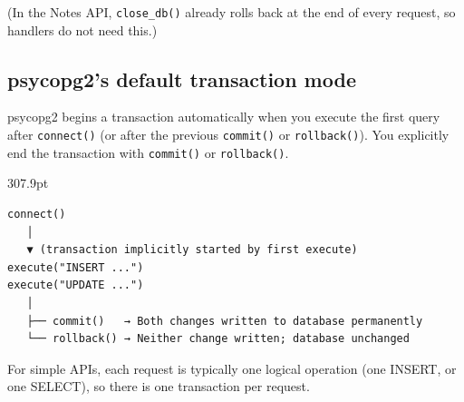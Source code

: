 \begin{codebox}[short]

\begin{Shaded}
\begin{Highlighting}[]
\NormalTok{:}
 \NormalTok{:}
\end{Highlighting}
\end{Shaded}

\end{codebox}

\noindent{}(In the Notes API, \texttt{close\_db()} already rolls back at the end of every request, so handlers do not need this.)

\subsection*{psycopg2's default transaction mode}\label{33-logic-execution:psycopg2s-default-transaction-mode}

psycopg2 begins a transaction automatically when you execute the first query after \texttt{connect()} (or after the previous \texttt{commit()} or \texttt{rollback()}). You explicitly end the transaction with \texttt{commit()} or \texttt{rollback()}.

\begin{diagrambox}[short]{307.9pt}
\begin{Verbatim}[fontsize=\fontsize{9.0}{8.55}\selectfont]
connect()
   │
   ▼ (transaction implicitly started by first execute)
execute("INSERT ...")
execute("UPDATE ...")
   │
   ├── commit()   → Both changes written to database permanently
   └── rollback() → Neither change written; database unchanged
\end{Verbatim}
\end{diagrambox}

\noindent{}For simple APIs, each request is typically one logical operation (one INSERT, or one SELECT), so there is one transaction per request.

